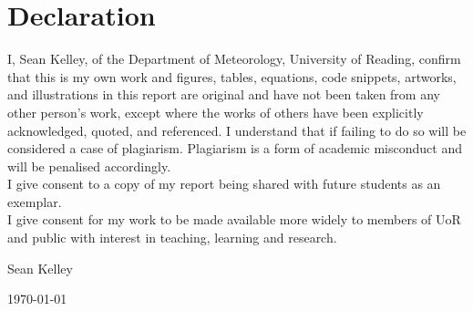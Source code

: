 \documentclass[a4paper,11pt,oneside]{book}
\begin{document}
    \chapter*{\Large Declaration}
    I, Sean Kelley, of the Department of Meteorology, University of Reading, confirm that this is my own work and figures, tables, equations, code snippets, artworks, and illustrations in this report are original and have not been taken from any other person's work, except where the works of others have been explicitly acknowledged, quoted, and referenced. I understand that if failing to do so will be considered a case of plagiarism. Plagiarism is a form of academic misconduct and will be penalised accordingly. \\

    \noindent
    I give consent to a copy of my report being shared with future students as an exemplar. \\
    
    \noindent
    I give consent for my work to be made available more widely to members of UoR and public with interest in teaching, learning and research.
    ~\\[1cm]
    \begin{flushright}
	Sean Kelley
    
    \today
    \end{flushright}
    
    

    

    \tableofcontents
    \listoffigures
    \listoftables
    

    \mainmatter
    
    
    
    
    
    
    

    
    
    \begin{appendices}
        
    \end{appendices}
    
\end{document}
